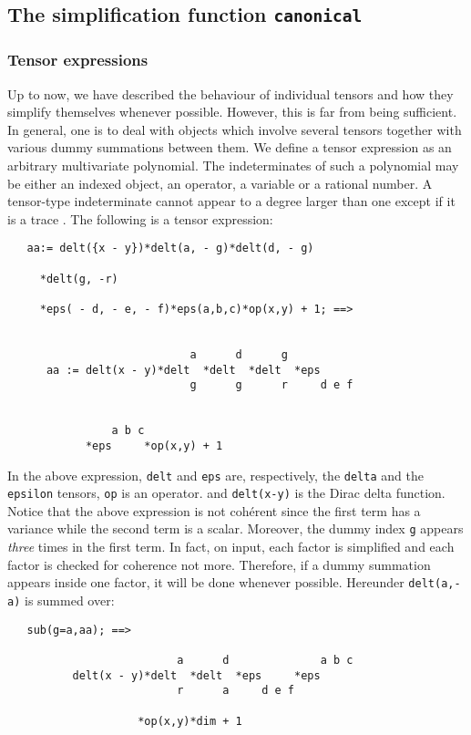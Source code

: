 \subsection{The simplification function \texttt{canonical}}

\subsubsection{Tensor expressions}
Up to now, we have described the behaviour of individual
tensors and how they simplify themselves whenever possible.
However, this is far from being sufficient. In general, one is
to deal with objects which involve several tensors together
with various dummy summations between them.
We define a tensor expression as an arbitrary multivariate
polynomial. The indeterminates of such a polynomial may be
either an indexed object, an operator, a variable or a rational number.
A tensor-type indeterminate cannot appear to a degree larger
than one except if it is a trace%
.
The following is a tensor expression:
\begin{verbatim}
   aa:= delt({x - y})*delt(a, - g)*delt(d, - g)

     *delt(g, -r)

     *eps( - d, - e, - f)*eps(a,b,c)*op(x,y) + 1; ==>


                            a      d      g
      aa := delt(x - y)*delt  *delt  *delt  *eps
                            g      g      r     d e f


                a b c
            *eps     *op(x,y) + 1
\end{verbatim}
In the above expression, \texttt{delt} and \texttt{eps} are, respectively, the
\texttt{delta} and the \texttt{epsilon} tensors,
\texttt{op} is an operator.
and \texttt{delt(x-y)} is the Dirac delta function.
Notice that the above expression is not coh\'erent since the first term
has a variance while the second term is a scalar. Moreover, the
dummy index \texttt{g} appears \emph{three} times in the first term.
In fact, on input, each factor  is simplified   and each
factor is checked for coherence not more.
Therefore, if a dummy summation  appears inside one factor, it will
be done whenever possible. Hereunder \texttt{delt(a,-a)} is
summed over:
\begin{verbatim}
   sub(g=a,aa); ==>

                          a      d              a b c
          delt(x - y)*delt  *delt  *eps     *eps
                          r      a     d e f

                    *op(x,y)*dim + 1
\end{verbatim}


